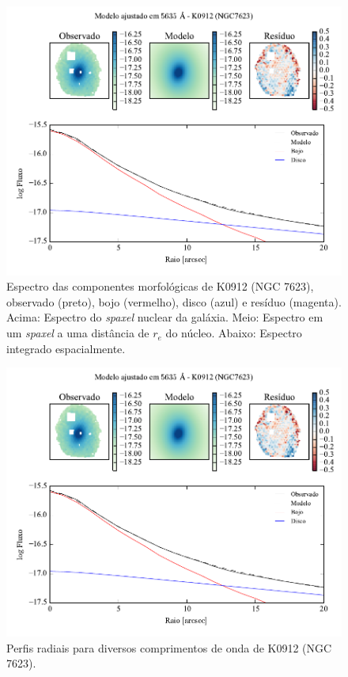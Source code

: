 \begin{figure}
	\includegraphics[page=4]{figuras-decomp/K0912_sample006a}
	\caption[Espectro das componentes morfológicas de K0912 (NGC 7623)]
	{Espectro das componentes morfológicas de K0912 (NGC 7623),
	observado (preto), bojo (vermelho), disco (azul) e resíduo (magenta). Acima:
	Espectro do {\em spaxel} nuclear da galáxia. Meio: Espectro em um {\em spaxel}
	a uma distância de $r_e$ do núcleo. Abaixo: Espectro integrado espacialmente.}
	\label{fig:decompSpectra:K0912}
\end{figure}

\begin{figure}
	\includegraphics[page=5]{figuras-decomp/K0912_sample006a}
	\caption[Perfis radiais para diversos comprimentos de onda de K0912 (NGC 7623)]
	{Perfis radiais para diversos comprimentos de onda de K0912 (NGC 7623).}
	\label{fig:decompRadprofSpec:K0912}
\end{figure}

